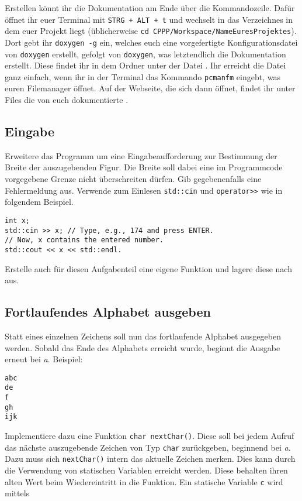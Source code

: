 Erstellen könnt ihr die Dokumentation am Ende über die Kommandozeile.
Dafür öffnet ihr euer Terminal mit \lstinline{STRG + ALT + t} und wechselt in das Verzeichnes in dem euer Projekt liegt (üblicherweise \lstinline{cd CPPP/Workspace/NameEuresProjektes}).
Dort gebt ihr \lstinline{doxygen -g} ein, welches euch eine vorgefertigte Konfigurationsdatei von \texttt{doxygen} erstellt, gefolgt von \lstinline{doxygen}, was letztendlich die Dokumentation erstellt.
Diese findet ihr in dem Ordner  unter der Datei .
Ihr erreicht die Datei ganz einfach, wenn ihr in der Terminal das Kommando \lstinline{pcmanfm} eingebt, was euren Filemanager öffnet.
Auf der Webseite, die sich dann öffnet, findet ihr unter Files die von euch dokumentierte .

\subsection{Eingabe}
Erweitere das Programm um eine Eingabeaufforderung zur Bestimmung der Breite der auszugebenden Figur.
Die Breite soll dabei eine im Programmcode vorgegebene Grenze nicht überschreiten dürfen.
Gib gegebenenfalls eine Fehlermeldung aus.
Verwende zum Einlesen \lstinline{std::cin} und \lstinline{operator>>} wie in folgendem Beispiel.

\begin{lstlisting}
int x;
std::cin >> x; // Type, e.g., 174 and press ENTER.
// Now, x contains the entered number.
std::cout << x << std::endl.
\end{lstlisting}

Erstelle auch für diesen Aufgabenteil eine eigene Funktion und lagere diese nach  aus.

\subsection{Fortlaufendes Alphabet ausgeben}
Statt eines einzelnen Zeichens soll nun das fortlaufende Alphabet ausgegeben werden.
Sobald das Ende des Alphabets erreicht wurde, beginnt die Ausgabe erneut bei \emph{a}.
Beispiel:

\begin{lstlisting}
abc
de
f
gh
ijk
\end{lstlisting}

Implementiere dazu eine Funktion \lstinline{char nextChar()}.
Diese soll bei jedem Aufruf das nächste auszugebende Zeichen von Typ \lstinline{char} zurückgeben, beginnend bei \emph{a}.
Dazu muss sich \lstinline{nextChar()} intern das aktuelle Zeichen merken.
Dies kann durch die Verwendung von statischen Variablen erreicht werden. Diese behalten ihren alten Wert beim Wiedereintritt in die Funktion.
Ein statische Variable \lstinline{c} wird mittels

